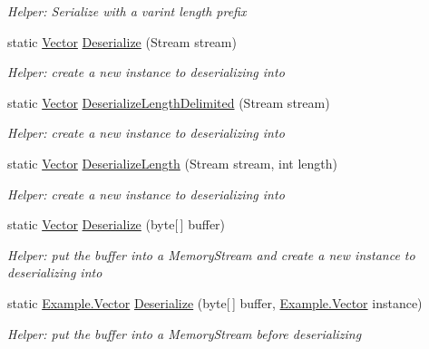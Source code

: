 \begin{DoxyCompactItemize}
\begin{DoxyCompactList}\small\item\em Helper\+: Serialize with a varint length prefix\end{DoxyCompactList}\item 
static \hyperlink{class_example_1_1_vector}{Vector} \hyperlink{class_example_1_1_vector_a818efcb4e8291291770ef378c1f25e9e}{Deserialize} (Stream stream)
\begin{DoxyCompactList}\small\item\em Helper\+: create a new instance to deserializing into\end{DoxyCompactList}\item 
static \hyperlink{class_example_1_1_vector}{Vector} \hyperlink{class_example_1_1_vector_ac0d43068ece1c2630c4251dff5e8ada0}{Deserialize\+Length\+Delimited} (Stream stream)
\begin{DoxyCompactList}\small\item\em Helper\+: create a new instance to deserializing into\end{DoxyCompactList}\item 
static \hyperlink{class_example_1_1_vector}{Vector} \hyperlink{class_example_1_1_vector_abe963061d88c30a7242d5bb92828d18f}{Deserialize\+Length} (Stream stream, int length)
\begin{DoxyCompactList}\small\item\em Helper\+: create a new instance to deserializing into\end{DoxyCompactList}\item 
static \hyperlink{class_example_1_1_vector}{Vector} \hyperlink{class_example_1_1_vector_a9f29e4e1efdfb2e0841623ff2311cce5}{Deserialize} (byte\mbox{[}$\,$\mbox{]} buffer)
\begin{DoxyCompactList}\small\item\em Helper\+: put the buffer into a Memory\+Stream and create a new instance to deserializing into\end{DoxyCompactList}\item 
static \hyperlink{class_example_1_1_vector}{Example.\+Vector} \hyperlink{class_example_1_1_vector_a2bedbd5f974dd3d18fc86300b673f55d}{Deserialize} (byte\mbox{[}$\,$\mbox{]} buffer, \hyperlink{class_example_1_1_vector}{Example.\+Vector} instance)
\begin{DoxyCompactList}\small\item\em Helper\+: put the buffer into a Memory\+Stream before deserializing\end{DoxyCompactList}\item 

\end{DoxyCompactItemize}
